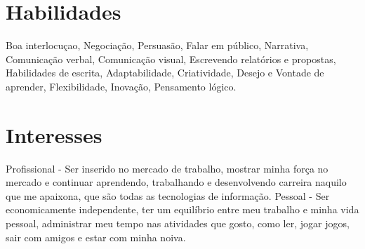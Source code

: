 \documentclass[]{cv-style}          %
\begin{document}

\section{Habilidades}
  \vspace{-0.4cm}

Boa interlocuçao,
Negociação,
Persuasão,
Falar em público,
Narrativa,
Comunicação verbal,
Comunicação visual,
Escrevendo relatórios e propostas,
Habilidades de escrita,
Adaptabilidade,
Criatividade,
Desejo e Vontade de aprender,
Flexibilidade,
Inovação,
Pensamento lógico.



\section{Interesses}

\begin{entrylist}
\entry
{Profissional}
{- {\normalfont Ser inserido no mercado de trabalho,  mostrar minha força no mercado e continuar aprendendo, trabalhando e desenvolvendo carreira naquilo que me apaixona, que são todas as tecnologias de informação.   }}
{}
{\vspace{-0.3cm}}
\entry
{Pessoal}
{- {\normalfont Ser economicamente independente, ter um equilíbrio entre meu trabalho e minha vida pessoal, administrar meu tempo nas atividades que gosto, como ler, jogar jogos, sair com amigos e estar com minha noiva.  }}
{}
{}
\end{entrylist}
\end{document}
